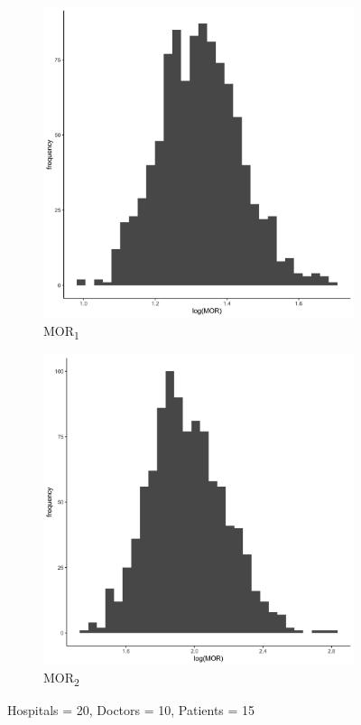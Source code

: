 \documentclass[
  letterpaper,
  DIV=11,
  numbers=noendperiod,
  titlepage]{scrartcl}
\begin{document}
\vspace{10mm}

\begin{figure}
\centering
\begin{subfigure}{.49\textwidth}
    \centering
    \includegraphics[width=.95\linewidth]{../../plots/three-lvl-ran-int/high-prev/hist_20_10_15_three_lvl_high_prev_mor1.png}  
    \caption{MOR\textsubscript{1}}
    \label{l20m10n151}
\end{subfigure}
\begin{subfigure}{.49\textwidth}
    \centering
    \includegraphics[width=.95\linewidth]{../../plots/three-lvl-ran-int/high-prev/hist_20_10_15_three_lvl_high_prev_mor2.png}  
    \caption{MOR\textsubscript{2}}
    \label{l20m10n152}
\end{subfigure}
\caption{Hospitals = 20, Doctors = 10, Patients = 15}
\label{mor1}
\end{figure}
\end{document}
